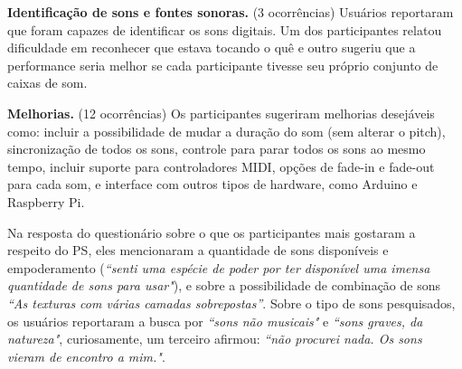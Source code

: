 \textbf{Identificação de sons e fontes sonoras.} (3 ocorrências)  Usuários reportaram que foram capazes de identificar os sons digitais. Um dos participantes relatou dificuldade em reconhecer que estava tocando o quê e outro sugeriu que a performance seria melhor se cada participante tivesse seu próprio conjunto de caixas de som.

\textbf{Melhorias.} (12 ocorrências) Os participantes sugeriram melhorias desejáveis como: incluir a possibilidade de mudar a duração do som (sem alterar o pitch), sincronização de todos os sons, controle para parar todos os sons ao mesmo tempo, incluir suporte para controladores MIDI, opções de fade-in e fade-out para cada som, e interface com outros tipos de hardware, como Arduino e Raspberry Pi. 

Na resposta do questionário sobre o que os participantes mais gostaram a respeito do PS, eles mencionaram a quantidade de sons disponíveis e empoderamento (\textit{``senti uma espécie de poder por ter disponível uma imensa quantidade de sons para usar"}), e sobre a possibilidade de combinação de sons \textit{``As texturas com várias camadas sobrepostas''}. Sobre o tipo de sons pesquisados, os usuários reportaram a busca por  \textit{``sons não musicais"} e \textit{``sons graves, da natureza"}, curiosamente, um terceiro afirmou: \textit{``não procurei nada. Os sons vieram de encontro a mim."}.







